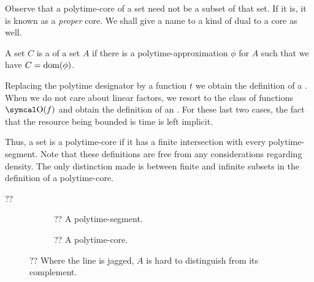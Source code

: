 Observe that a polytime-core of a set need not be a subset of that set.
If it is, it is known as a \emph{proper} core.
We shall give a name to a kind of dual to a core as well.
\begin{definition}
  A set $C$ is a  of a set $A$ if there is a polytime-approximation $\phi$ for $A$ such that we have $C = \operatorname{dom}(\phi)$.

  Replacing the polytime designator by a function $t$ we obtain the definition of a .
  When we do not care about linear factors, we resort to the class of functions $\bigO(f)$ and obtain the definition of an .
  For these last two cases, the fact that the resource being bounded is time is left implicit.
\end{definition}
Thus, a set is a polytime-core if it has a finite intersection with every polytime-segment.
Note that these definitions are free from any considerations regarding density.
The only distinction made is between finite and infinite subsets in the definition of a polytime-core.

\begin{example}
  ??
  \begin{figure}
    \centering
    \begin{subfigure}{0.4\textwidth}
      \centering
      \caption{?? A polytime-segment.}
    \end{subfigure}
    \qquad
    \begin{subfigure}{0.4\textwidth}
      \centering
      \caption{?? A polytime-core.}
    \end{subfigure}
    \caption{?? Where the line is jagged, $A$ is hard to distinguish from its complement.}
    \label{fig:segmentcore}
  \end{figure}
\end{example}

